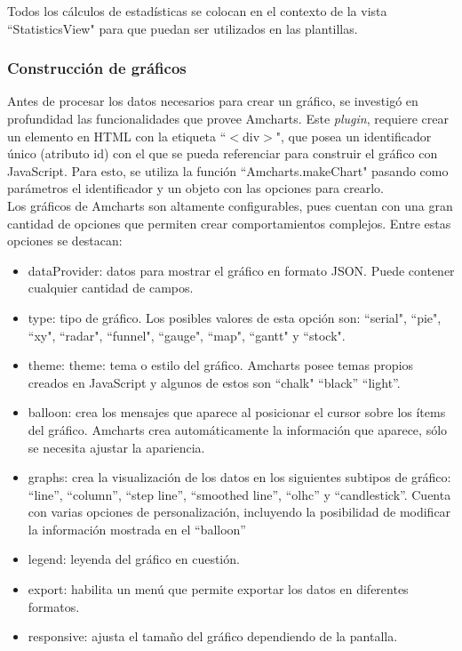 Todos los cálculos de estadísticas se colocan en el contexto de la vista “StatisticsView" para que puedan ser utilizados en las plantillas.

\subsubsection{Construcción de gráficos}

Antes de procesar los datos necesarios para crear un gráfico, se investigó en profundidad las funcionalidades que provee Amcharts. Este \textit{plugin}, requiere crear un elemento en HTML con la etiqueta “$<$div$>$", que posea un identificador único (atributo id) con el que se pueda referenciar para construir el gráfico con JavaScript. Para esto, se utiliza la función “Amcharts.makeChart" pasando como parámetros el identificador y un objeto con las opciones para crearlo.\\

Los gráficos de Amcharts son altamente configurables, pues cuentan con una gran cantidad de opciones que permiten crear comportamientos complejos. Entre estas opciones se destacan:

\begin{itemize}
    \item dataProvider: datos para mostrar el gráfico en formato JSON. Puede contener cualquier cantidad de campos.
    \item type: tipo de gráfico. Los posibles valores de esta opción son: “serial", “pie", “xy", “radar", “funnel", “gauge", “map", “gantt" y “stock".
    \item theme: theme: tema o estilo del gráfico. Amcharts posee temas propios creados en JavaScript y algunos de estos son “chalk" “black” “light”.
    \item balloon: crea los mensajes que aparece al posicionar el cursor sobre los ítems del gráfico. Amcharts crea automáticamente la información que aparece, sólo se necesita ajustar la apariencia.
    \item graphs: crea la visualización de los datos en los siguientes subtipos de gráfico: “line”, “column”, “step line”, “smoothed line”, “olhc” y “candlestick”. Cuenta con varias opciones de personalización, incluyendo la posibilidad de modificar la información mostrada en el “balloon”
    \item legend: leyenda del gráfico en cuestión.
    \item export: habilita un menú que permite exportar los datos en diferentes formatos.
    \item responsive: ajusta el tamaño del gráfico dependiendo de la pantalla.
\end{itemize}


